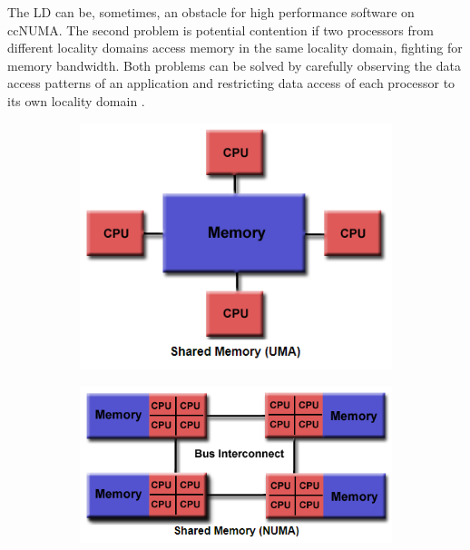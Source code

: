 \begin{itemize}
The LD can be, sometimes, an obstacle for high performance software on ccNUMA. The second problem is potential
contention if two processors from different locality domains access memory in the same locality domain, fighting for memory bandwidth. Both problems can be solved by carefully observing the data access patterns of an application and restricting data access of each processor to its own locality domain \cite{}.
\begin{figure}[!h]
\centering 
  \begin{subfigure}[b]{0.4\textwidth}
    \includegraphics[width=\textwidth]{images/uma.png}
    \caption{}
    \label{uma}
  \end{subfigure}
  \begin{subfigure}[b]{0.4\textwidth}
    \includegraphics[width=\textwidth]{images/numa.png}
    \caption{}
    \label{numa}
  \end{subfigure}
\end{figure}

\end{itemize}
